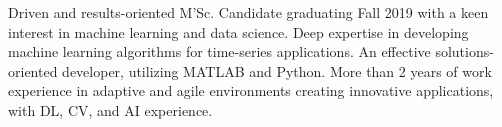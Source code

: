 

\begin{cvparagraph}

Driven and results-oriented M'Sc. Candidate graduating Fall 2019 with a keen interest in machine learning and data science. Deep expertise in developing machine learning algorithms for time-series applications. An effective solutions-oriented developer, utilizing MATLAB and Python. More than 2 years of work experience in adaptive and agile environments creating innovative applications, with DL, CV, and AI experience.
\end{cvparagraph}
